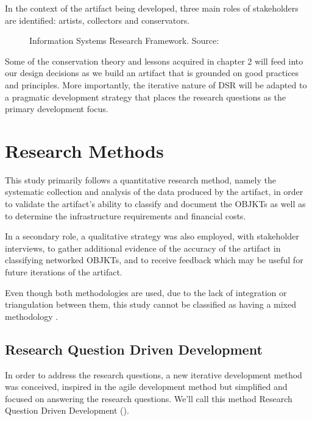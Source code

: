In the context of the artifact being developed, three main roles of stakeholders are identified: artists, collectors and conservators.

\begin{figure}[h]
    \centering
    
    \caption[Information Systems Research Framework]{Information Systems Research Framework. Source: \cite[p.80]{hevnerDesignScienceInformation2004}}
    \label{fig:is-research-framework}
\end{figure}

Some of the conservation theory and lessons acquired in chapter 2 will feed into our design decisions as we build an artifact that is grounded on good practices and principles.
More importantly, the iterative nature of DSR will be adapted to a pragmatic development strategy that places the research questions as the primary development focus.

\section{Research Methods}

This study primarily follows a quantitative research method, namely the systematic collection and analysis of the data produced by the artifact, in order to validate the artifact's ability to classify and document the OBJKTs as well as to determine the infrastructure requirements and financial costs.

In a secondary role, a qualitative strategy was also employed, with stakeholder interviews, to gather additional evidence of the accuracy of the artifact in classifying networked OBJKTs, and to receive feedback which may be useful for future iterations of the artifact.

Even though both methodologies are used, due to the lack of integration or triangulation between them, this study cannot be classified as having a mixed methodology \cite{turnerResearchDesignMixed2017}.


\subsection{Research Question Driven Development}

In order to address the research questions, a new iterative development method was conceived, inspired in the agile development method \cite{shoreArtAgileDevelopment2021} but simplified and focused on answering the research questions. We'll call this method Research Question Driven Development ().

